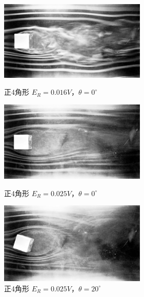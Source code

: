 \documentclass[twocolumn,10pt,a4j]{jsarticle}
\begin{document}
      \begin{figure}[htbp]
        \begin{minipage}{0.5\hsize}
          \begin{center}
            \includegraphics[width=7cm]{../img/kashika/004.jpg}
            \caption{正4角形 $E_{R}=0.016V， \theta=0^\circ$}
          \end{center}
        \end{minipage}
        \begin{minipage}{0.5\hsize}
          \begin{center}
            \includegraphics[width=7cm]{../img/kashika/005.jpg}
            \caption{正4角形 $E_{R}=0.025V， \theta=0^\circ$}
          \end{center}
        \end{minipage}
        \begin{minipage}{0.5\hsize}
          \begin{center}
            \includegraphics[width=7cm]{../img/kashika/006.jpg}
            \caption{正4角形 $E_{R}=0.025V， \theta=20^\circ$}
          \end{center}
        \end{minipage}
        \begin{minipage}{0.5\hsize}

\end{minipage}
\end{figure}
\end{document}
